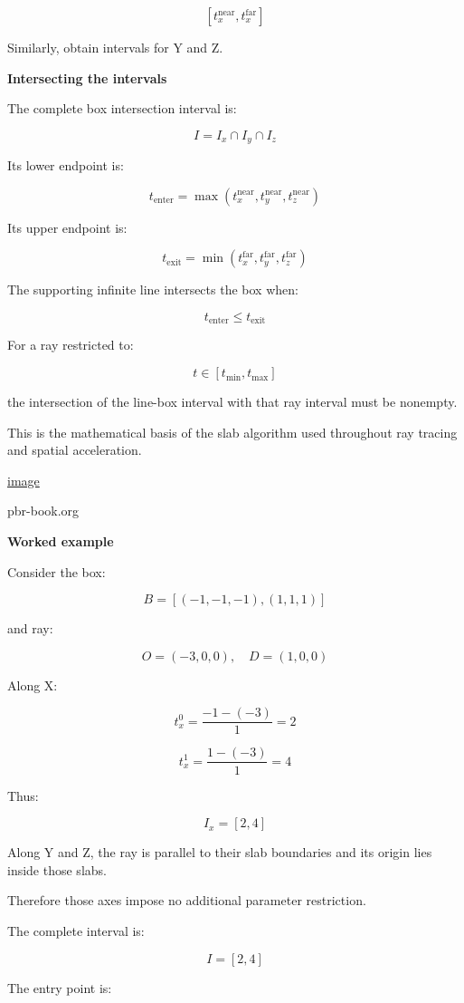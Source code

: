 \[
[t_x^{\mathrm{near}},t_x^{\mathrm{far}}]
\]

Similarly, obtain intervals for Y and Z.

\textbf{Intersecting the intervals}

The complete box intersection interval is:

\[
I=I_x\cap I_y\cap I_z
\]

Its lower endpoint is:

\[
\boxed{ t_{\mathrm{enter}}= \max(t_x^{\mathrm{near}},t_y^{\mathrm{near}},t_z^{\mathrm{near}}) }
\]

Its upper endpoint is:

\[
\boxed{ t_{\mathrm{exit}}= \min(t_x^{\mathrm{far}},t_y^{\mathrm{far}},t_z^{\mathrm{far}}) }
\]

The supporting infinite line intersects the box when:

\[
\boxed{ t_{\mathrm{enter}}\le t_{\mathrm{exit}} }
\]

For a ray restricted to:

\[
t\in[t_{\min},t_{\max}]
\]

the intersection of the line-box interval with that ray interval must be nonempty.

This is the mathematical basis of the slab algorithm used throughout ray tracing and spatial acceleration. 

\href{https://www.google.com/s2/favicons?domain=https://www.pbr-book.org&sz=32}{image}

pbr-book.org

\textbf{Worked example}

Consider the box:

\[
B=[(-1,-1,-1),(1,1,1)]
\]

and ray:

\[
O=(-3,0,0),\quad D=(1,0,0)
\]

Along X:

\[
t_x^0=\frac{-1-(-3)}1=2
\]

\[
t_x^1=\frac{1-(-3)}1=4
\]

Thus:

\[
I_x=[2,4]
\]

Along Y and Z, the ray is parallel to their slab boundaries and its origin lies inside those slabs.

Therefore those axes impose no additional parameter restriction.

The complete interval is:

\[
\boxed{I=[2,4]}
\]

The entry point is:

